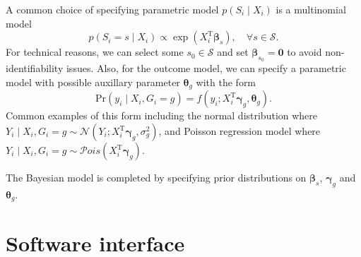 \documentclass{article}
\begin{document}
A common choice of specifying parametric model $p(S_i\mid X_i)$ is a multinomial model $$p(S_i = s\mid X_i) \propto \exp(X_i^\mathrm{T} \boldsymbol{\beta}_s), \quad\forall s \in \mathcal{S}.$$ For technical reasons, we can select some $s_0\in\mathcal{S}$ and set $\boldsymbol{\beta}_{s_0} = \boldsymbol{0}$ to avoid non-identifiability issues. Also, for the outcome model, we can specify a parametric model with possible auxillary parameter $\boldsymbol{\theta}_g$ with the form $$\mathrm{Pr}(y_i\mid X_i, G_i = g) = f(y_i; X_i^\mathrm{T}\boldsymbol{\gamma}_g, \boldsymbol{\theta}_g).$$
Common examples of this form including the normal distribution where $Y_i \mid X_i, G_i = g \sim \mathcal{N}(Y_i; X_i^\mathrm{T}\boldsymbol{\gamma}_g, \sigma_g^2)$, and Poisson regression model where $Y_i\mid X_i, G_i = g\sim \mathcal{P}ois(X_i^\mathrm{T}\boldsymbol{\gamma}_g)$.

The Bayesian model is completed by specifying prior distributions on $\boldsymbol{\beta}_s$, $\boldsymbol{\gamma}_g$ and $\boldsymbol{\theta}_g$.

\section{Software interface}
\end{document}
